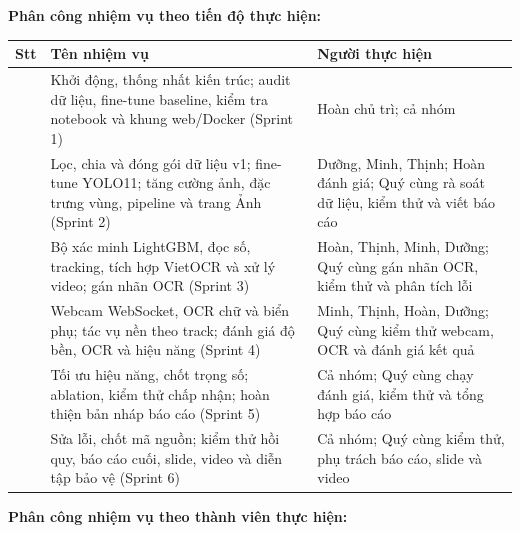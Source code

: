 
\noindent\textbf{Phân công nhiệm vụ theo tiến độ thực hiện:}

\begingroup
{}
\noindent
\begin{tabularx}{\textwidth}{|>{\centering\arraybackslash}p{1.0cm}|>{\raggedright\arraybackslash}X|>{\raggedright\arraybackslash}p{4.2cm}|}
\hline
\textbf{Stt} & \centering\arraybackslash\textbf{Tên nhiệm vụ} & \centering\arraybackslash\textbf{Người thực hiện} \\ \hline
1 & Khởi động, thống nhất kiến trúc; audit dữ liệu, fine-tune baseline, kiểm tra notebook và khung web/Docker (Sprint 1) & Hoàn chủ trì; cả nhóm \\ \hline
2 & Lọc, chia và đóng gói dữ liệu v1; fine-tune YOLO11; tăng cường ảnh, đặc trưng vùng, pipeline và trang Ảnh (Sprint 2) & Dưỡng, Minh, Thịnh; Hoàn đánh giá; Quý cùng rà soát dữ liệu, kiểm thử và viết báo cáo \\ \hline
3 & Bộ xác minh LightGBM, đọc số, tracking, tích hợp VietOCR và xử lý video; gán nhãn OCR (Sprint 3) & Hoàn, Thịnh, Minh, Dưỡng; Quý cùng gán nhãn OCR, kiểm thử và phân tích lỗi \\ \hline
4 & Webcam WebSocket, OCR chữ và biển phụ; tác vụ nền theo track; đánh giá độ bền, OCR và hiệu năng (Sprint 4) & Minh, Thịnh, Hoàn, Dưỡng; Quý cùng kiểm thử webcam, OCR và đánh giá kết quả \\ \hline
5 & Tối ưu hiệu năng, chốt trọng số; ablation, kiểm thử chấp nhận; hoàn thiện bản nháp báo cáo (Sprint 5) & Cả nhóm; Quý cùng chạy đánh giá, kiểm thử và tổng hợp báo cáo \\ \hline
6 & Sửa lỗi, chốt mã nguồn; kiểm thử hồi quy, báo cáo cuối, slide, video và diễn tập bảo vệ (Sprint 6) & Cả nhóm; Quý cùng kiểm thử, phụ trách báo cáo, slide và video \\ \hline
\end{tabularx}
\endgroup

\clearpage
\noindent\textbf{Phân công nhiệm vụ theo thành viên thực hiện:}

